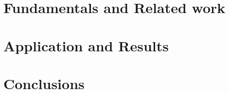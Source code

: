 \documentclass[11pt,a4paper,oneside,openright]{report}
\begin{document}
\part {Fundamentals and Related work}
\part {Application and Results}
\part {Conclusions}

%




\end{document}
